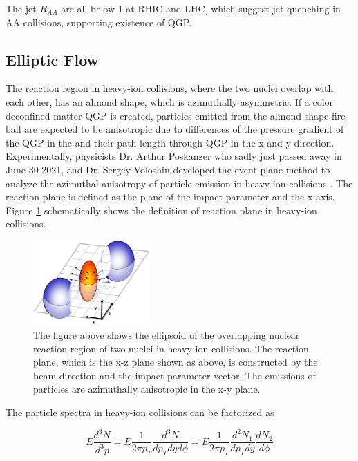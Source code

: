 The jet $R_{AA}$ are all below 1 at RHIC and LHC, which suggest jet quenching in AA collisions, supporting existence of QGP.

\subsection{Elliptic Flow} 

The reaction region in heavy-ion collisions, where the two nuclei overlap with each other, has an almond shape, which is azimuthally asymmetric. If a color deconfined matter QGP is created, particles emitted from the almond shape fire ball are expected to be anisotropic due to differences of the pressure gradient of the QGP in the and their path length through QGP in the x and y direction. Experimentally, physicists Dr. Arthur Poskanzer who sadly just passed away in June 30 2021, and Dr. Sergey Voloshin developed the event plane method to analyze the azimuthal anisotropy of particle emission in heavy-ion collisions \cite{EllipticFlow}. The reaction plane is defined as the plane of the impact parameter and the x-axis. Figure \ref{EventPlane} schematically shows the definition of reaction plane in heavy-ion collisions.

\begin{figure}[hbtp]
\begin{center}
\includegraphics[width=0.40\textwidth]{Figures/Chapter1/ReactionPlane.jpg}
\caption{The figure above shows the ellipsoid of the overlapping nuclear reaction region of two nuclei in heavy-ion collisions. The reaction plane, which is the x-z plane shown as above, is constructed by the beam direction and the impact parameter vector. The emissions of particles are azimuthally anisotropic in the x-y plane.}
\label{EventPlane}
\end{center}
\end{figure} 

The particle spectra in heavy-ion collisions can be factorized as 

\begin{equation}
E \frac{d^3N}{d^3p} = E \frac{1}{2 \pi p_T}\frac{d^3N}{dp_T dy d\phi} = E \frac{1}{2 \pi p_T} \frac{d^2N_1}{dp_T dy} \frac{dN_2}{d\phi}
\end{equation}

